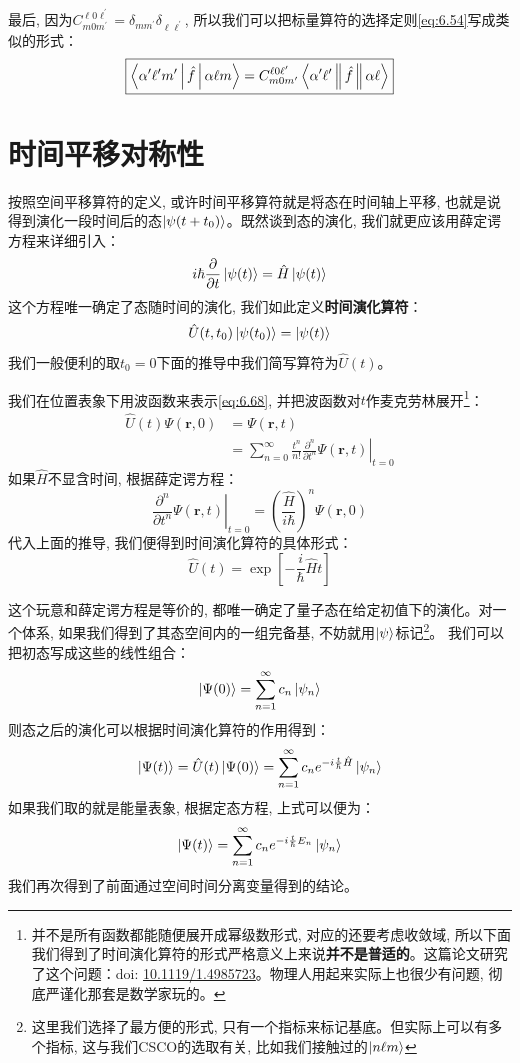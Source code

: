 \documentclass[a4paper,zihao=-4,linespread=1]{ctexrep}
\newcommand{\DOI}[1]{doi: \href{https://doi.org/#1}{#1}} %
\begin{document}
    最后, 因为$C^{\ell 0\ell^\prime}_{m0m^\prime}=\delta_{mm^\prime}\delta_{\ell\ell^\prime}$, 所以我们可以把标量算符的选择定则\ref{eq:6.54}写成类似的形式：
    \begin{equation}
        \boxed{\Braket{\alpha^\prime\ell^\prime m^\prime|\hat{f}|\alpha \ell m}=C^{\ell 0\ell^\prime}_{m0m^\prime}\Braket{\alpha^\prime \ell^\prime \|\hat{f}\|\alpha\ell }}
    \end{equation}

    \section{时间平移对称性}
    按照空间平移算符的定义, 或许时间平移算符就是将态在时间轴上平移, 也就是说得到演化一段时间后的态$\ket{\psi(t+t_0)}$。既然谈到态的演化, 我们就更应该用薛定谔方程来详细引入：
    \[i\hbar\frac{\partial}{\partial t}\ket{\psi(t)}=\hat{H}\ket{\psi(t)}\]
    这个方程唯一确定了态随时间的演化, 我们如此定义\textbf{时间演化算符}：
    \begin{equation}
        \label{eq:6.68}
        \hat{U}(t,t_0)\ket{\psi(t_0)}=\ket{\psi(t)}
    \end{equation}
    我们一般便利的取$t_0=0$下面的推导中我们简写算符为$\hat{U}(t)$。

    我们在位置表象下用波函数来表示\ref{eq:6.68}, 并把波函数对$t$作麦克劳林展开\footnote{并不是所有函数都能随便展开成幂级数形式, 对应的还要考虑收敛域, 所以下面我们得到了时间演化算符的形式严格意义上来说\textbf{并不是普适的}。这篇论文研究了这个问题：\DOI{10.1119/1.4985723}。物理人用起来实际上也很少有问题, 彻底严谨化那套是数学家玩的。}：
    \begin{align*}
        \hat{U}(t)\Psi(\mathbf{r},0)&=\Psi(\mathbf{r},t)\\
        &=\sum_{n=0}^\infty \frac{t^n}{n!}\left.\frac{\partial^{n}}{\partial t^{n}} \Psi(\mathbf{r}, t)\right|_{t=0}
    \end{align*}
    如果$\hat{H}$不显含时间, 根据薛定谔方程：
    \begin{equation}
        \left.\frac{\partial^{n}}{\partial t^{n}} \Psi(\mathbf{r}, t)\right|_{t=0}=\left(\frac{\hat{H}}{i\hbar}\right)^n\Psi(\mathbf{r},0)
    \end{equation}
    代入上面的推导, 我们便得到时间演化算符的具体形式：
    \begin{equation}
        \label{eq:6.70}
        \boxed{\hat{U}(t)=\exp \left[-\frac{i }{\hbar} \hat{H}t\right]}
    \end{equation}
    
    这个玩意和薛定谔方程是等价的, 都唯一确定了量子态在给定初值下的演化。对一个体系, 如果我们得到了其态空间内的一组完备基, 不妨就用$\ket{\psi}$标记\footnote{这里我们选择了最方便的形式, 只有一个指标来标记基底。但实际上可以有多个指标, 这与我们CSCO的选取有关, 比如我们接触过的$\ket{n\ell m}$}。
    我们可以把初态写成这些的线性组合：
    \[\ket{\Psi(0)}=\sum_{n=1}^{\infty}c_n\ket{\psi_n}\]
    则态之后的演化可以根据时间演化算符的作用得到：
    \[\ket{\Psi(t)}=\hat{U}(t)\ket{\Psi(0)}=\sum_{n=1}^{\infty}c_ne^{-i\frac{t}{\hbar}\hat{H}}\ket{\psi_n}\]
    如果我们取的就是能量表象, 根据定态方程, 上式可以便为：
    \[\ket{\Psi(t)}=\sum_{n=1}^{\infty}c_ne^{-i\frac{t}{\hbar}E_n}\ket{\psi_n}\]
    我们再次得到了前面通过空间时间分离变量得到的结论。
    
\end{document}
